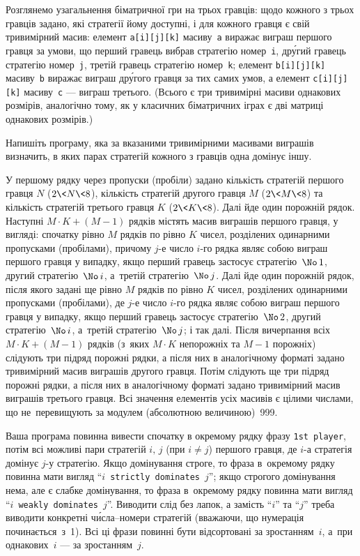 ﻿Розглянемо узагальнення біматричної гри на трьох гравців: щодо кожного з трьох гравців задано, які стратегії йому доступні, і для кожного гравця є свій тривимірний масив: елемент \texttt{a[i][j][k]} масиву~\texttt{a} виражає виграш першого гравця за умови, що 
перший гравець вибрав стратегію номер~\texttt{i}, 
др\'{у}гий гравець стратегію номер~\texttt{j}, 
третій гравець стратегію номер~\texttt{k};
елемент \texttt{b[i][j][k]} масиву~\texttt{b} виражає виграш др\'{у}гого гравця за тих самих умов, 
а елемент \texttt{с[i][j][k]} масиву~\texttt{c} --- виграш третього.
 (Всього є три тривимірні масиви однакових розмірів, аналогічно тому, як у класичних біматричних іграх є дві матриці однакових розмірів.)

Напишіть програму, яка за вказаними тривимірними масивами виграшів визначить, в яких парах стратегій кожного з гравців одна домінує іншу.

\InputFile
У першому рядку через пропуски (пробіли) задано кількість стратегій першого гравця $N$ ($2{{\<}}N{{\<}}8$), кількість стратегій другого гравця $M$ ($2{{\<}}M{{\<}}8$) та кількість стратегій третього гравця $K$ ($2{{\<}}K{{\<}}8$).
Далі йде один порожній рядок.
Наступні ${M\cdot{}K}{{+}}{(M-1)}$ рядків містять масив виграшів першого гравця, у вигляді: спочатку рівно $M$ рядків по рівно $K$ чисел, розділених одинарними пропусками (пробілами), причому {$j$-е} число {$i$-го} рядка являє собою виграш першого гравця у випадку, якщо перший гравець застосує стратегію~$\No\,1$, другий стратегію~$\No\,i$, а~третій стратегію~$\No\,j$. Далі йде один порожній рядок, після якого задані ще рівно $M$ рядків по рівно $K$ чисел, розділених одинарними пропусками (пробілами), де {$j$-е} число {$i$-го} рядка являє собою виграш першого гравця у випадку, якщо перший гравець застосує стратегію~$\No\,2$, другий стратегію~$\No\,i$, а~третій стратегію~$\No\,j$; і так далі. Після вичерпання всіх ${M\cdot{}K}{{+}}{(M-1)}$ рядків (з~яких ${M\cdot{}K}$ непорожніх та ${M{-}1}$ порожніх) слідують три підряд порожні рядки, а після них в аналогічному форматі задано тривимірний масив виграшів другого гравця. Потім слідують ще три підряд порожні рядки, а після них в аналогічному форматі задано тривимірний масив виграшів третього гравця. Всі значення елементів усіх масивів є цілими числами, що не~перевищують за модулем (абсолютною величиною)~999.

\OutputFile
Ваша програма повинна вивести спочатку в окремому рядку фразу \texttt{1st~player}, потім всі можливі пари стратегій $i,\,j$ (при $i{\neq}j$) першого гравця, де {$i$-а} стратегія домінує {$j$-у} стратегію. Якщо домінування строге, то фраза в~окремому рядку повинна мати вигляд ``$i$~\texttt{strictly dominates}~$j$''; якщо строгого домінування нема, але є слабке домінування, то фраза в~окремому рядку повинна мати вигляд ``$i$~\texttt{weakly dominates}~$j$''. Виводити слід без лапок, а замість ``$i$'' та ``$j$'' треба виводити конкретні ч\'{и}сла--номери стратегій (вважаючи, що нумерація починається~з~1).
Всі ці фрази повинні бути відсортовані за зростанням~$i$, а~при однакових~$i$ --- за зростанням~$j$.

